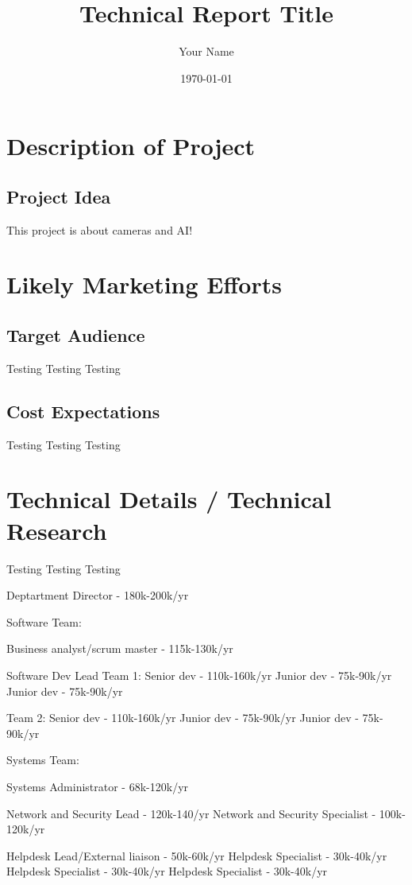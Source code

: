 \documentclass{report}
\title{Technical Report Title}
\author{Your Name}
\date{\today}
\begin{document}
\maketitle

\tableofcontents
\newpage

\chapter{Description of Project}
\section{Project Idea}
This project is about cameras and AI!

\chapter{Likely Marketing Efforts}
\section{Target Audience}
Testing Testing Testing
\section{Cost Expectations}
Testing Testing Testing

\chapter{Technical Details / Technical Research}
Testing Testing Testing

Deptartment Director - 180k-200k/yr

Software Team:

Business analyst/scrum master - 115k-130k/yr

Software Dev Lead
	Team 1:
Senior dev - 110k-160k/yr
	Junior dev - 75k-90k/yr
	Junior dev - 75k-90k/yr
	
	Team 2:
	Senior dev - 110k-160k/yr
	Junior dev - 75k-90k/yr
	Junior dev - 75k-90k/yr


Systems Team:

Systems Administrator - 68k-120k/yr

Network and Security Lead - 120k-140/yr
    Network and Security Specialist - 100k-120k/yr
	
Helpdesk Lead/External liaison - 50k-60k/yr
	Helpdesk Specialist - 30k-40k/yr
	Helpdesk Specialist - 30k-40k/yr
	Helpdesk Specialist - 30k-40k/yr
\end{document}
